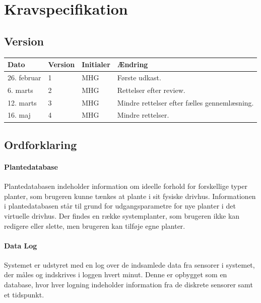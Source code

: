 \chapter{Kravspecifikation} \label{ch:Kravspec}

\section*{Version}

\begin{table}[h]
	\centering
	\begin{tabularx}{\textwidth - 2cm}{|l|l|l|X|}
	\hline
	Dato	& Version	& Initialer & Ændring	\\ \hline
	26. februar & 1 & MHG & Første udkast. \\ \hline
	6. marts & 2 & MHG & Rettelser efter review. \\ \hline
	12. marts & 3 & MHG & Mindre rettelser efter fælles gennemlæsning. \\\hline
	16. maj & 4 & MHG & Mindre rettelser. \\\hline
	\end{tabularx}
\end{table}

\clearpage


\section{Ordforklaring}

\subsubsection{Plantedatabase}

Plantedatabasen indeholder information om ideelle forhold for forskellige typer planter, som brugeren kunne tænkes at plante i sit fysiske drivhus.
Informationen i plantedatabasen står til grund for udgangsparametre for nye planter i det virtuelle drivhus. 
Der findes en række systemplanter, som brugeren ikke kan redigere eller slette, men brugeren kan tilføje egne planter.

\subsubsection{Data Log}

Systemet er udstyret med en log over de indsamlede data fra sensorer i systemet, der måles og indskrives i loggen hvert minut. 
Denne er opbygget som en database, hvor hver logning indeholder information fra de diskrete sensorer samt et tidspunkt.

